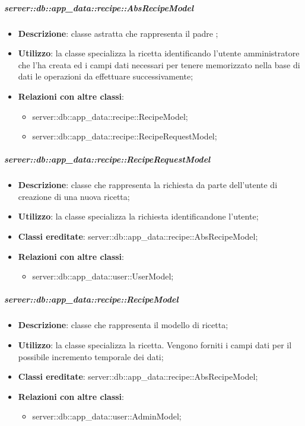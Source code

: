 		\subparagraph{server::db::app\_data::recipe::AbsRecipeModel} %
		\label{subp:server_db_app_data_recipe_absrecipemodel}
			\begin{itemize}
				\item \textbf{Descrizione}: classe astratta che rappresenta il padre ;
				\item \textbf{Utilizzo}: la classe specializza la ricetta identificando l'utente amministratore che l'ha creata ed i campi dati necessari per tenere memorizzato nella base di dati le operazioni da effettuare successivamente;
				\item \textbf{Relazioni con altre classi}:
					\begin{itemize}
						\item server::db::app\_data::recipe::RecipeModel;
						\item server::db::app\_data::recipe::RecipeRequestModel;
					\end{itemize}
			\end{itemize}


		\subparagraph{server::db::app\_data::recipe::RecipeRequestModel} %
		\label{subp:server_db_app_data_recipe_reciperequestmodel}
			\begin{itemize}
				\item \textbf{Descrizione}: classe che rappresenta la richiesta da parte dell'utente di creazione di una nuova ricetta;
				\item \textbf{Utilizzo}: la classe specializza la richiesta identificandone l'utente;
				\item \textbf{Classi ereditate}: server::db::app\_data::recipe::AbsRecipeModel;
				\item \textbf{Relazioni con altre classi}:
					\begin{itemize}
						\item server::db::app\_data::user::UserModel;
					\end{itemize}
			\end{itemize}


		\subparagraph{server::db::app\_data::recipe::RecipeModel} %
		\label{subp:server_db_app_data_recipe_recipemodel}
			\begin{itemize}
				\item \textbf{Descrizione}: classe che rappresenta il modello di ricetta;
				\item \textbf{Utilizzo}: la classe specializza la ricetta. Vengono forniti i campi dati per il possibile incremento temporale dei dati;
				\item \textbf{Classi ereditate}: server::db::app\_data::recipe::AbsRecipeModel;
				\item \textbf{Relazioni con altre classi}:
					\begin{itemize}
						\item server::db::app\_data::user::AdminModel;
					\end{itemize}
			\end{itemize}


